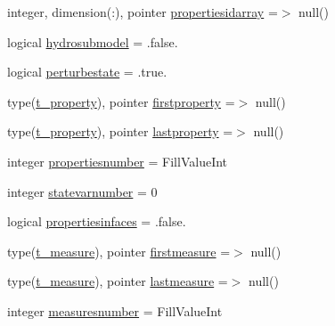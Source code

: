 \begin{DoxyCompactItemize}
\item 
integer, dimension(\+:), pointer \mbox{\hyperlink{structmodulesequentialassimilation_1_1t__sequentialassimilation_aa4247ddf78fab6f87a65712951a39c5b}{propertiesidarray}} =$>$ null()
\item 
logical \mbox{\hyperlink{structmodulesequentialassimilation_1_1t__sequentialassimilation_a322e03d53e27756f53e102b931a83a5e}{hydrosubmodel}} = .false.
\item 
logical \mbox{\hyperlink{structmodulesequentialassimilation_1_1t__sequentialassimilation_a34c1d404765b2c48c63aaaf8ef58c7ce}{perturbestate}} = .true.
\item 
type(\mbox{\hyperlink{structmodulesequentialassimilation_1_1t__property}{t\+\_\+property}}), pointer \mbox{\hyperlink{structmodulesequentialassimilation_1_1t__sequentialassimilation_adeeb2959549abd50c876bf6a2b2a1981}{firstproperty}} =$>$ null()
\item 
type(\mbox{\hyperlink{structmodulesequentialassimilation_1_1t__property}{t\+\_\+property}}), pointer \mbox{\hyperlink{structmodulesequentialassimilation_1_1t__sequentialassimilation_a82518b23c48e2049070e0735f2665d28}{lastproperty}} =$>$ null()
\item 
integer \mbox{\hyperlink{structmodulesequentialassimilation_1_1t__sequentialassimilation_ad1848ac630612e5a324774a30b8af54a}{propertiesnumber}} = Fill\+Value\+Int
\item 
integer \mbox{\hyperlink{structmodulesequentialassimilation_1_1t__sequentialassimilation_a11607eb82a9eada97e7ed9fb68f72caf}{statevarnumber}} = 0
\item 
logical \mbox{\hyperlink{structmodulesequentialassimilation_1_1t__sequentialassimilation_a951b21754d76c3d51fee65caa35ec197}{propertiesinfaces}} = .false.
\item 
type(\mbox{\hyperlink{structmodulesequentialassimilation_1_1t__measure}{t\+\_\+measure}}), pointer \mbox{\hyperlink{structmodulesequentialassimilation_1_1t__sequentialassimilation_a77d85312d1742674fc727e5be89bdddd}{firstmeasure}} =$>$ null()
\item 
type(\mbox{\hyperlink{structmodulesequentialassimilation_1_1t__measure}{t\+\_\+measure}}), pointer \mbox{\hyperlink{structmodulesequentialassimilation_1_1t__sequentialassimilation_a577e30f8c565093305b97fc425d00742}{lastmeasure}} =$>$ null()
\item 
integer \mbox{\hyperlink{structmodulesequentialassimilation_1_1t__sequentialassimilation_a8eb65605f9f7a320fac04575a4e90450}{measuresnumber}} = Fill\+Value\+Int
\item 

\end{DoxyCompactItemize}
